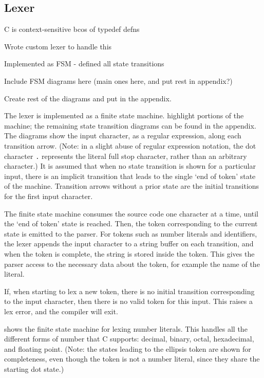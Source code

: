 \documentclass[00-main.tex]{subfiles}
\begin{document}
\subsection{Lexer}

\begin{Comment}
C is context-sensitive bcos of typedef defns

Wrote custom lexer to handle this

Implemented as FSM - defined all state transitions

Include FSM diagrams here (main ones here, and put rest in appendix?)
\end{Comment}
\begin{Comment}
Create rest of the diagrams and put in the appendix.
\end{Comment}

The lexer is implemented as a finite state machine.  highlight portions of the machine; the remaining state transition diagrams can be found in the appendix.
The diagrams show the input character, as a regular expression, along each transition arrow. (Note: in a slight abuse of regular expression notation, the dot character \texttt{.} represents the literal full stop character, rather than an arbitrary character.)
It is assumed that when no state transition is shown for a particular input, 
there is an implicit transition that leads to the single `end of token' state of the machine.
Transition arrows without a prior state are the initial transitions for the first input character.

The finite state machine consumes the source code one character at a time, until the `end of token' state is reached.
Then, the token corresponding to the current state is emitted to the parser.
For tokens such as number literals and identifiers, the lexer appends the input character to a string buffer on each transition, and when the token is complete, the string is stored inside the token.
This gives the parser access to the necessary data about the token, for example the name of the literal.

If, when starting to lex a new token, there is no initial transition corresponding to the input character, then there is no valid token for this input. This raises a lex error, and the compiler will exit.

 shows the finite state machine for lexing number literals. This handles all the different forms of number that C supports: decimal, binary, octal, hexadecimal, and floating point.
(Note: the states leading to the ellipsis token are shown for completeness, even though the token is not a number literal, since they share the starting dot state.)
\end{document}
